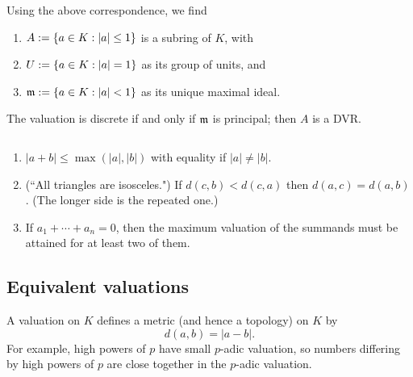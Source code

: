 Using the above correspondence, we find
\begin{enumerate}
\item
$A:=\left\{{a\in K}:{|a|\le1}\right\}$ is a subring of $K$, with 
\item
$U:=\left\{{a\in K}:{|a|=1}\right\}$ as its group of units, and
\item
$\mathfrak{m}:=\left\{{a\in K}:{|a|<1}\right\}$ as its unique maximal ideal.
\end{enumerate}
The valuation is discrete if and only if $\mathfrak{m}$ is principal; then $A$ is a DVR.

\begin{pr}
$\,$
\begin{enumerate}
\item
$|a+b|\le \max(|a|,|b|)$ with equality if $|a|\ne |b|$.
\item (``All triangles are isosceles.") If $d(c,b)<d(c,a)$ then $d(a,c)=d(a,b)$. (The longer side is the repeated one.)
\item If $a_1+\cdots +a_n=0$, then the maximum valuation of the summands must be attained for at least two of them.
\end{enumerate}
\end{pr}
\subsection{Equivalent valuations}
A valuation on $K$ defines a metric (and hence a topology) on $K$ by
\[
d(a,b)=|a-b|.
\]
For example, high powers of $p$ have small $p$-adic valuation, so numbers differing by high powers of $p$ are close together in the $p$-adic valuation.

